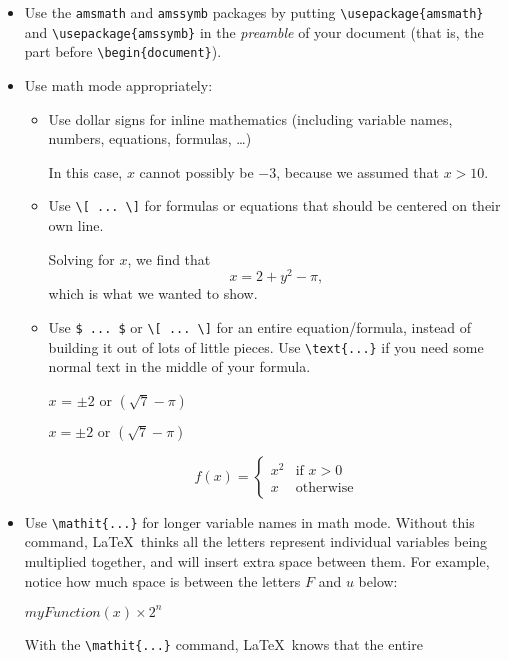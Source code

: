 \documentclass{article}
\begin{document}
\begin{itemize}
\item Use the \texttt{amsmath} and \texttt{amssymb} packages by
  putting \verb|\usepackage{amsmath}| and \verb|\usepackage{amssymb}|
  in the \emph{preamble} of your document (that is, the part before
  \verb|\begin{document}|).
\item Use math mode appropriately:
  \begin{itemize}
  \item Use dollar signs for inline mathematics (including variable
    names, numbers, equations, formulas, \dots)
    \begin{good}
In this case, $x$ cannot possibly be $-3$, because we assumed that $x > 10$.
    \end{good}
  \item Use \verb|\[ ... \]| for formulas or equations that should be
    centered on their own line.
    \begin{good}
Solving for $x$, we find that \[ x = 2 + y^2 - \pi, \] which is what we wanted to show.
    \end{good}
 \item Use \verb|$ ... $| or \verb|\[ ... \]| for an entire
   equation/formula, instead of building it out of lots of little
   pieces. Use \verb|\text{...}| if you need some normal text in the
     middle of your formula.
   \begin{bad}
$x$ = $\pm 2$ or $(\sqrt{7} - \pi)$
   \end{bad}
   \begin{good}
$x = \pm 2 \text{ or } (\sqrt{7} - \pi)$
   \end{good}
   \begin{good}
\[ f(x) = \begin{cases} x^2 & \text{if } x > 0 \\ x & \text{otherwise} \end{cases} \]
   \end{good}
  \end{itemize}
\item Use \verb|\mathit{...}| for longer variable names in math mode.
  Without this command, \LaTeX\ thinks all the letters represent
  individual variables being multiplied together, and will insert
  extra space between them.  For example, notice how much space is
  between the letters $F$ and $u$ below:
  \begin{bad}
$myFunction(x) \times 2^n$
  \end{bad}
  With the \verb|\mathit{...}| command, \LaTeX\ knows that the entire

\end{itemize}
\end{document}
